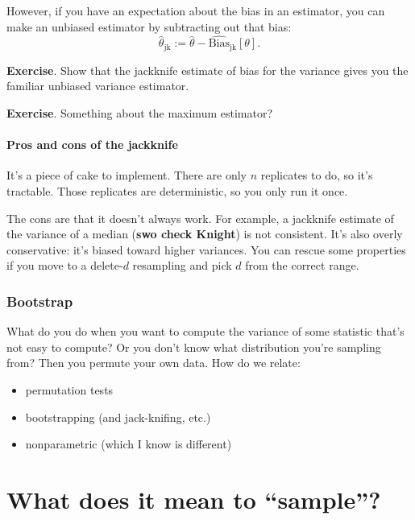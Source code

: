 \documentclass{book}
\providecommand{\tightlist}{%
  \setlength{\itemsep}{0pt}\setlength{\parskip}{0pt}}
\begin{document}
However, if you have an expectation about the bias in an estimator, you
can make an unbiased estimator by subtracting out that bias: \[
\hat{\theta}_\mathrm{jk} := \hat{\theta} - \widehat{\mathrm{Bias}}_\mathrm{jk}[\theta].
\]

\textbf{Exercise}. Show that the jackknife estimate of bias for the
variance gives you the familiar unbiased variance estimator.

\textbf{Exercise}. Something about the maximum estimator?

\paragraph{Pros and cons of the
jackknife}\label{pros-and-cons-of-the-jackknife}

It's a piece of cake to implement. There are only \(n\) replicates to
do, so it's tractable. Those replicates are deterministic, so you only
run it once.

The cons are that it doesn't always work. For example, a jackknife
estimate of the variance of a median (\textbf{swo check Knight}) is not
consistent. It's also overly conservative: it's biased toward higher
variances. You can rescue some properties if you move to a delete-\(d\)
resampling and pick \(d\) from the correct range.

\subsubsection{Bootstrap}\label{bootstrap}

What do you do when you want to compute the variance of some statistic
that's not easy to compute? Or you don't know what distribution you're
sampling from? Then you permute your own data. How do we relate:

\begin{itemize}
\tightlist
\item
  permutation tests
\item
  bootstrapping (and jack-knifing, etc.)
\item
  nonparametric (which I know is different)
\end{itemize}

\section{\texorpdfstring{What does it mean to
``sample''?}{What does it mean to sample?}}\label{what-does-it-mean-to-sample}
\end{document}
